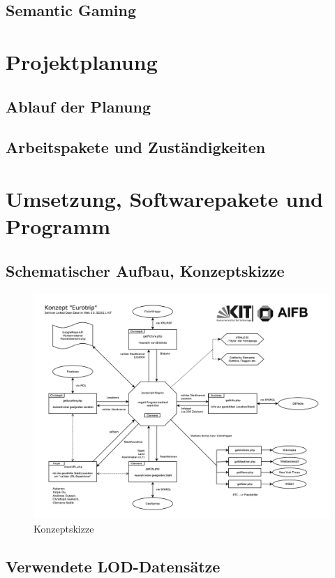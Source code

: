 \documentclass[a4paper, 11pt]{article}
\begin{document}
\subsection{Semantic Gaming}
\newpage
\section{Projektplanung}
\subsection{Ablauf der Planung}
\subsection{Arbeitspakete und Zuständigkeiten}
\newpage
\section{Umsetzung, Softwarepakete und Programm}
\subsection{Schematischer Aufbau, Konzeptskizze}

\begin{figure}
	\centering
	\includegraphics[width=1.4\columnwidth, angle=90]{seminarLOD.png}
	\caption{Konzeptskizze}
	\label{img:grafik-dummy}
\end{figure}

\subsection{Verwendete LOD-Datensätze}
\end{document}
